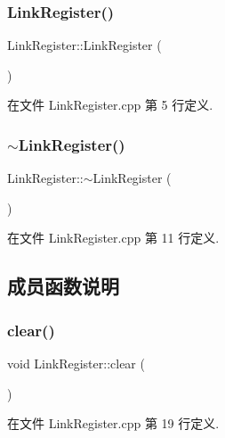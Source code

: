 \subsubsection{\texorpdfstring{Link\+Register()}{LinkRegister()}}
{\footnotesize\ttfamily Link\+Register\+::\+Link\+Register (\begin{DoxyParamCaption}{ }\end{DoxyParamCaption})}



在文件 Link\+Register.\+cpp 第 5 行定义.

\mbox{\label{class_link_register_a0e78844a8ababa2284571a62e421871f}} 
\subsubsection{\texorpdfstring{$\sim$\+Link\+Register()}{~LinkRegister()}}
{\footnotesize\ttfamily Link\+Register\+::$\sim$\+Link\+Register (\begin{DoxyParamCaption}{ }\end{DoxyParamCaption})}



在文件 Link\+Register.\+cpp 第 11 行定义.



\subsection{成员函数说明}
\mbox{\label{class_link_register_a1af4133a7b637815860d3efb4e84d3f3}} 
\subsubsection{\texorpdfstring{clear()}{clear()}}
{\footnotesize\ttfamily void Link\+Register\+::clear (\begin{DoxyParamCaption}{ }\end{DoxyParamCaption})}



在文件 Link\+Register.\+cpp 第 19 行定义.

\mbox{\label{class_link_register_abe4840e598dc18dee95cd979513160aa}} 
